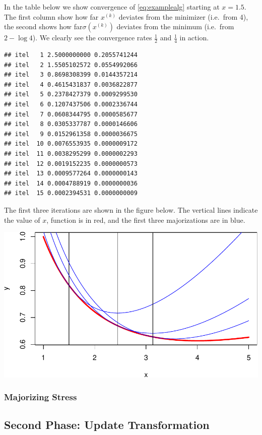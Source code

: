 \documentclass[
  12pt,
]{article}
\begin{document}
In the table below we show convergence of \eqref{eq:examplealg} starting
at \(x=1.5\). The first column show how far \(x^{(k)}\) deviates from the
minimizer (i.e.~from 4), the second shows how far\(\sigma(x^{(k)})\)
deviates from the minimum (i.e.~from \(2-\log 4\)). We clearly see the
convergence rates \(\frac12\) and \(\frac14\) in action.

\begin{verbatim}
## itel   1 2.5000000000 0.2055741244 
## itel   2 1.5505102572 0.0554992066 
## itel   3 0.8698308399 0.0144357214 
## itel   4 0.4615431837 0.0036822877 
## itel   5 0.2378427379 0.0009299530 
## itel   6 0.1207437506 0.0002336744 
## itel   7 0.0608344795 0.0000585677 
## itel   8 0.0305337787 0.0000146606 
## itel   9 0.0152961358 0.0000036675 
## itel  10 0.0076553935 0.0000009172 
## itel  11 0.0038295299 0.0000002293 
## itel  12 0.0019152235 0.0000000573 
## itel  13 0.0009577264 0.0000000143 
## itel  14 0.0004788919 0.0000000036 
## itel  15 0.0002394531 0.0000000009
\end{verbatim}

The first three iterations are shown in the figure below. The vertical
lines indicate the value of \(x\), function is in red, and the first three
majorizations are in blue.

\begin{center}\includegraphics{smacofBS_files/figure-latex/majplot-1} \end{center}

\subsubsection{Majorizing Stress}\label{majorizing-stress}

\subsection{Second Phase: Update Transformation}\label{second-phase-update-transformation}
\end{document}
